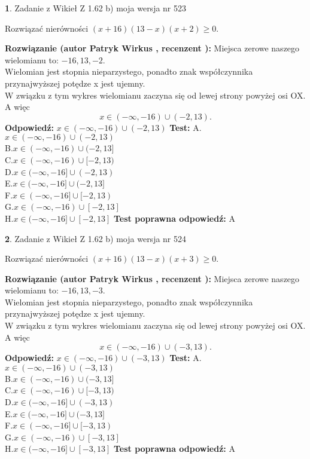 \documentclass[12pt, a4paper]{article}
\theoremstyle{definition} %
\newtheorem{zad}{}
\newcommand{\zadStart}[1]{\begin{zad}#1\newline}
\newcommand{\zadStop}{\end{zad}}
\newcommand{\rozwStart}[2]{\noindent \textbf{Rozwiązanie (autor #1 , recenzent #2): }\newline}
\newcommand{\rozwStop}{\newline}
\newcommand{\odpStart}{\noindent \textbf{Odpowiedź:}\newline}
\newcommand{\odpStop}{\newline}
\newcommand{\testStart}{\noindent \textbf{Test:}\newline}
\newcommand{\testStop}{\newline}
\newcommand{\kluczStart}{\noindent \textbf{Test poprawna odpowiedź:}\newline}
\newcommand{\kluczStop}{\newline}
\begin{document}
\zadStart{Zadanie z Wikieł Z 1.62 b) moja wersja nr 523}

Rozwiązać nierówności $(x+16)(13-x)(x+2)\ge0$.
\zadStop
\rozwStart{Patryk Wirkus}{}
Miejsca zerowe naszego wielomianu to: $-16, 13, -2$.\\
Wielomian jest stopnia nieparzystego, ponadto znak współczynnika przy\linebreak najwyższej potędze x jest ujemny.\\ W związku z tym wykres wielomianu zaczyna się od lewej strony powyżej osi OX. A więc $$x \in (-\infty,-16) \cup (-2,13).$$
\rozwStop
\odpStart
$x \in (-\infty,-16) \cup (-2,13)$
\odpStop
\testStart
A.$x \in (-\infty,-16) \cup (-2,13)$\\
B.$x \in (-\infty,-16) \cup (-2,13]$\\
C.$x \in (-\infty,-16) \cup [-2,13)$\\
D.$x \in (-\infty,-16] \cup (-2,13)$\\
E.$x \in (-\infty,-16] \cup (-2,13]$\\
F.$x \in (-\infty,-16] \cup [-2,13)$\\
G.$x \in (-\infty,-16) \cup [-2,13]$\\
H.$x \in (-\infty,-16] \cup [-2,13]$
\testStop
\kluczStart
A
\kluczStop



\zadStart{Zadanie z Wikieł Z 1.62 b) moja wersja nr 524}

Rozwiązać nierówności $(x+16)(13-x)(x+3)\ge0$.
\zadStop
\rozwStart{Patryk Wirkus}{}
Miejsca zerowe naszego wielomianu to: $-16, 13, -3$.\\
Wielomian jest stopnia nieparzystego, ponadto znak współczynnika przy\linebreak najwyższej potędze x jest ujemny.\\ W związku z tym wykres wielomianu zaczyna się od lewej strony powyżej osi OX. A więc $$x \in (-\infty,-16) \cup (-3,13).$$
\rozwStop
\odpStart
$x \in (-\infty,-16) \cup (-3,13)$
\odpStop
\testStart
A.$x \in (-\infty,-16) \cup (-3,13)$\\
B.$x \in (-\infty,-16) \cup (-3,13]$\\
C.$x \in (-\infty,-16) \cup [-3,13)$\\
D.$x \in (-\infty,-16] \cup (-3,13)$\\
E.$x \in (-\infty,-16] \cup (-3,13]$\\
F.$x \in (-\infty,-16] \cup [-3,13)$\\
G.$x \in (-\infty,-16) \cup [-3,13]$\\
H.$x \in (-\infty,-16] \cup [-3,13]$
\testStop
\kluczStart
A
\kluczStop
\end{document}
